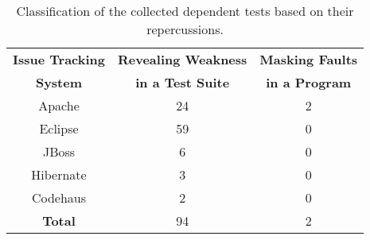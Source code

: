 \begin{table}
\centering
\setlength{\tabcolsep}{0.15\tabcolsep}
\begin{tabular}{|c||c|c|}
\hline
\textbf{Issue Tracking} & \textbf{Revealing Weakness} & \textbf{Masking Faults} \\
\textbf{System } & \textbf{in a Test Suite} & \textbf{in a Program} \\
\hline
Apache &24 & 2 \\
\hline
Eclipse & 59 & 0 \\
\hline
JBoss& 6 & 0 \\
\hline
Hibernate & 3 & 0 \\
\hline
Codehaus & 2 & 0 \\
\hline
\hline
\textbf{Total}  & 94 & 2 \\
\hline
\end{tabular}
\caption{
Classification of the collected dependent tests
based on their repercussions.
}
\label{tab:reper}
\end{table}

